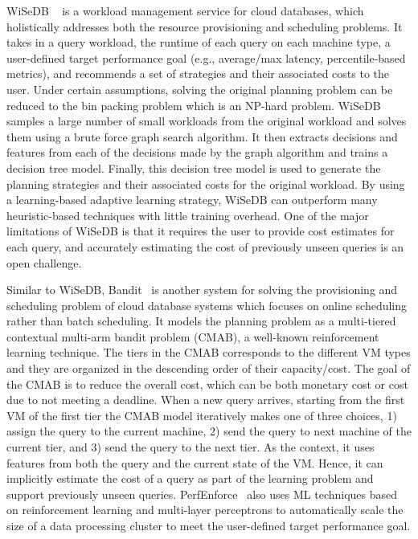 WiSeDB ~\cite{wisedb} is a workload management service for cloud databases, which holistically addresses both the resource provisioning and scheduling problems.
It takes in a query workload, the runtime of each query on each machine type, a user-defined target performance goal (e.g., average/max latency, percentile-based metrics), and recommends a set of strategies and their associated costs to the user.
Under certain assumptions, solving the original planning problem can be reduced to the bin packing problem which is an NP-hard problem.
WiSeDB samples a large number of small workloads from the original workload and solves them using a brute force graph search algorithm.
It then extracts decisions and features from each of the decisions made by the graph algorithm and trains a decision tree model.
Finally, this decision tree model is used to generate the planning strategies and their associated costs for the original workload.
By using a learning-based adaptive learning strategy, WiSeDB can outperform many heuristic-based techniques with little training overhead.
One of the major limitations of WiSeDB is that it requires the user to provide cost estimates for each query, and accurately estimating the cost of previously unseen queries is an open challenge.


Similar to WiSeDB, Bandit~\cite{bandit} is another system for solving the provisioning and scheduling problem of cloud database systems which focuses on online scheduling rather than batch scheduling.
It models the planning problem as a multi-tiered contextual multi-arm bandit problem (CMAB), a well-known reinforcement learning technique.
The tiers in the CMAB corresponds to the different VM types and they are organized in the descending order of their capacity/cost. 
The goal of the CMAB is to reduce the overall cost, which can be both monetary cost or cost due to not meeting a deadline.
When a new query arrives, starting from the first VM of the first tier the CMAB model iteratively makes one of three choices, 1) assign the query to the current machine, 2) send the query to next machine of the current tier, and 3) send the query to the next tier.
As the context, it uses features from both the query and the current state of the VM. Hence, it can implicitly estimate the cost of a query as part of the learning problem and support previously unseen queries.
PerfEnforce~\cite{perfenforce} also uses ML techniques based on reinforcement learning and multi-layer perceptrons to automatically scale the size of a data processing cluster to meet the user-defined target performance goal.

